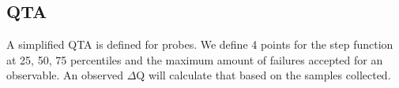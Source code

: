     \subsection{QTA}
        A simplified QTA is defined for probes. We define 4 points for the step function at 25, 50, 75 percentiles and the maximum amount of failures accepted for an observable. An observed $\Delta$Q will calculate that based on the samples collected. 

